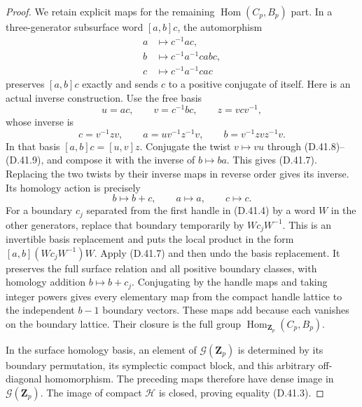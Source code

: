 \begin{proof}
We retain explicit maps for the remaining
\(\operatorname{Hom}(C_p,B_p)\) part.
In a three-generator subsurface word
\([a,b]c\), the automorphism
\[
 \begin{split}
 a&\longmapsto c^{-1}ac,\\
 b&\longmapsto c^{-1}a^{-1}cab c,\\
 c&\longmapsto c^{-1}a^{-1}ca c
 \end{split}
 \tag{D.41.7}
\]
preserves \([a,b]c\) exactly and sends
\(c\) to a positive conjugate of itself.
Here is an actual inverse construction.
Use the free basis
\[
 u=ac,\qquad v=c^{-1}bc,\qquad z=vcv^{-1},
 \tag{D.41.8}
\]
whose inverse is
\[
 c=v^{-1}zv,\qquad
 a=uv^{-1}z^{-1}v,\qquad
 b=v^{-1}zvz^{-1}v.
 \tag{D.41.9}
\]
In that basis \([a,b]c=[u,v]z\).
Conjugate the twist \(v\mapsto vu\) through
\textup{(D.41.8)--(D.41.9)}, and compose it
with the inverse of \(b\mapsto ba\).
This gives \textup{(D.41.7)}.
Replacing the two twists by their inverse
maps in reverse order gives its inverse.
Its homology action is precisely
\[
                   b\longmapsto b+c,\qquad
                   a\longmapsto a,\qquad
                   c\longmapsto c.
 \tag{D.41.10}
\]
For a boundary \(c_j\) separated from the
first handle in \textup{(D.41.4)} by a word
\(W\) in the other generators, replace that
boundary temporarily by \(Wc_jW^{-1}\).
This is an invertible basis replacement
and puts the local product in the form
\([a,b](Wc_jW^{-1})W\).
Apply \textup{(D.41.7)} and then undo the
basis replacement.  It preserves the full
surface relation and all positive boundary
classes, with homology addition \(b\mapsto b+c_j\).
Conjugating by the handle maps and taking
integer powers gives every elementary
map from the compact handle lattice to
the independent \(b-1\) boundary vectors.
These maps add because each vanishes on
the boundary lattice.  Their closure is
the full group \(\operatorname{Hom}_{\mathbf Z_p}(C_p,B_p)\).

In the surface homology basis, an element
of \(\mathcal G(\mathbf Z_p)\) is determined
by its boundary permutation, its symplectic
compact block, and this arbitrary off-diagonal
homomorphism.
The preceding maps therefore have dense
image in \(\mathcal G(\mathbf Z_p)\).
The image of compact \(\mathcal H\) is
closed, proving equality
\textup{(D.41.3)}.


\end{proof}
